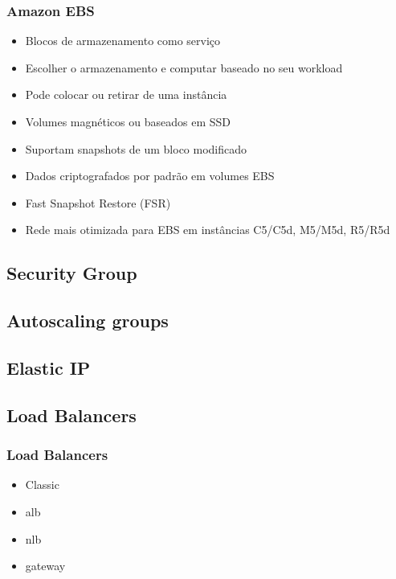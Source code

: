\begin{frame}
	\frametitle{Amazon EBS}
	\begin{itemize}
		\item Blocos de armazenamento como serviço
		\item Escolher o armazenamento e computar baseado no seu workload
		\item Pode colocar ou retirar de uma instância
		\item Volumes magnéticos ou baseados em SSD
		\item Suportam snapshots de um bloco modificado
		\item Dados criptografados por padrão em volumes EBS
		\item Fast Snapshot Restore (FSR)
		\item Rede mais otimizada para EBS em instâncias C5/C5d, M5/M5d, R5/R5d
	\end{itemize}
\end{frame}

\subsection{Security Group}

\subsection{Autoscaling groups}

\subsection{Elastic IP}

\subsection{Load Balancers}

\begin{frame}
	\frametitle{Load Balancers}
	\begin{itemize}
		\item Classic
		\item alb
		\item nlb
		\item gateway
	\end{itemize}
\end{frame}



